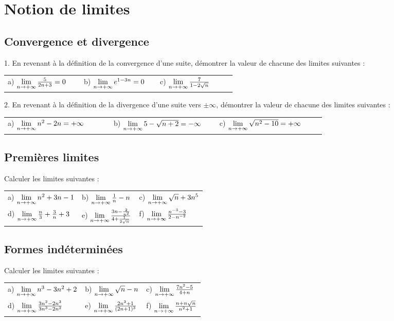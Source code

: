 \documentclass[oneside,12pt]{book}          %
\begin{document}
\section{Notion de limites}

\subsection{Convergence et divergence}
1. En revenant à la définition de la convergence d'une suite, démontrer la valeur de chacune des limites suivantes :

\begin{tabular}{p{0.3\linewidth}p{0.3\linewidth}p{0.3\linewidth}}
	a) ${\lim\limits_{n\to +\infty}}\,\frac{5}{2n+3}=0$ & b) ${\lim\limits_{n\to +\infty}}\, e^{1-3n}=0$ & c) ${\lim\limits_{n\to +\infty}}\, \frac{7}{1-2\sqrt{n}}$
\end{tabular}

2. En revenant à la définition de la divergence d'une suite vers $\pm \infty$, démontrer la valeur de chacune des limites suivantes :

\begin{tabular}{p{0.3\linewidth}p{0.3\linewidth}p{0.3\linewidth}}
	a) ${\lim\limits_{n\to +\infty}}\, n^2-2n=+\infty$ & b) ${\lim\limits_{n\to +\infty}}\, 5-\sqrt{n+2}=-\infty$ & c) ${\lim\limits_{n\to +\infty}}\, \sqrt{n^2-10}=+\infty$
\end{tabular}



\subsection{Premières limites}
Calculer les limites suivantes :

\renewcommand{\arraystretch}{1.5}
\begin{tabular}{p{} p{} p{}}
    a) ${\lim\limits_{n\to +\infty}}\, n^2+3n-1$ & b) ${\lim\limits_{n\to +\infty}}\, \frac{1}{n}-n$ & c) ${\lim\limits_{n\to +\infty}}\, \sqrt{n}+3n^5$\\
    d) ${\lim\limits_{n\to +\infty}}\, \frac{n}{3}+\frac{3}{n}+3$ & e) ${\lim\limits_{n\to +\infty}}\, \frac{3n-\frac{2}{n^2}}{4+\frac{1}{2\sqrt{n}}}$ & f) ${\lim\limits_{n\to +\infty}}\, \frac{n^{-3}-3}{2-n^{-2}}$
\end{tabular}



\subsection{Formes indéterminées}
Calculer les limites suivantes :

\renewcommand{\arraystretch}{1.5}
\begin{tabular}{p{} p{} p{}}
    a) ${\lim\limits_{n\to +\infty}}\, n^3-3n^2+2$ & b) ${\lim\limits_{n\to +\infty}}\, \sqrt{n}-n$ & c) ${\lim\limits_{n\to +\infty}}\, \frac{7n^2-5}{4+n}$\\
    d) ${\lim\limits_{n\to +\infty}}\, \frac{3n^2-2n^3}{3n^3-2n^2}$ & e) ${\lim\limits_{n\to +\infty}}\, \frac{2n^3+1}{(2n+1)^3}$ & f) ${\lim\limits_{n\to +\infty}}\, \frac{n+n\sqrt{n}}{n^2+1}$
\end{tabular}
\end{document}
